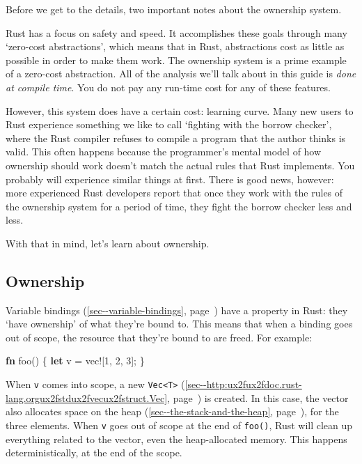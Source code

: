 \documentclass[a4paper,]{book}
\renewcommand*{\hyperref}[2][\ar]{%
  \def\ar{#2}%
  #2 (\autoref{#1}, page~\pageref{#1})}
\newenvironment{Shaded}{\begin{snugshade}}{\end{snugshade}}
\newcommand{\KeywordTok}[1]{\textcolor[rgb]{0.13,0.29,0.53}{\textbf{{#1}}}}
\newcommand{\DecValTok}[1]{\textcolor[rgb]{0.00,0.00,0.81}{{#1}}}
\newcommand{\OtherTok}[1]{\textcolor[rgb]{0.56,0.35,0.01}{{#1}}}
\newcommand{\NormalTok}[1]{{#1}}
\begin{document}
Before we get to the details, two important notes about the ownership
system.

Rust has a focus on safety and speed. It accomplishes these goals
through many `zero-cost abstractions', which means that in Rust,
abstractions cost as little as possible in order to make them work. The
ownership system is a prime example of a zero-cost abstraction. All of
the analysis we'll talk about in this guide is \emph{done at compile
time}. You do not pay any run-time cost for any of these features.

However, this system does have a certain cost: learning curve. Many new
users to Rust experience something we like to call `fighting with the
borrow checker', where the Rust compiler refuses to compile a program
that the author thinks is valid. This often happens because the
programmer's mental model of how ownership should work doesn't match the
actual rules that Rust implements. You probably will experience similar
things at first. There is good news, however: more experienced Rust
developers report that once they work with the rules of the ownership
system for a period of time, they fight the borrow checker less and
less.

With that in mind, let's learn about ownership.

\subsection{Ownership}\label{ownership}

\hyperref[sec--variable-bindings]{Variable bindings} have a property in
Rust: they `have ownership' of what they're bound to. This means that
when a binding goes out of scope, the resource that they're bound to are
freed. For example:

\begin{Shaded}
\begin{Highlighting}[]
\KeywordTok{fn} \NormalTok{foo() \{}
    \KeywordTok{let} \NormalTok{v = }\OtherTok{vec!}\NormalTok{[}\DecValTok{1}\NormalTok{, }\DecValTok{2}\NormalTok{, }\DecValTok{3}\NormalTok{];}
\NormalTok{\}}
\end{Highlighting}
\end{Shaded}

When \texttt{v} comes into scope, a new
\hyperref[sec--http:ux2fux2fdoc.rust-lang.orgux2fstdux2fvecux2fstruct.Vec]{\texttt{Vec\textless{}T\textgreater{}}}
is created. In this case, the vector also allocates space on
\hyperref[sec--the-stack-and-the-heap]{the heap}, for the three
elements. When \texttt{v} goes out of scope at the end of
\texttt{foo()}, Rust will clean up everything related to the vector,
even the heap-allocated memory. This happens deterministically, at the
end of the scope.
\end{document}

